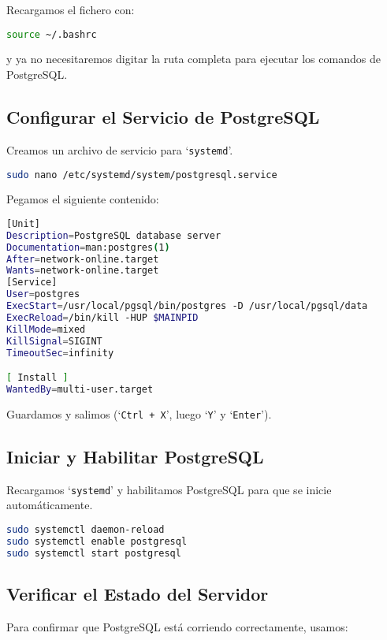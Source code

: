 \documentclass{article}
\begin{document}
Recargamos el fichero con:

\begin{lstlisting}[language=bash]
source ~/.bashrc
\end{lstlisting}

y ya no necesitaremos digitar la ruta completa para ejecutar los comandos de PostgreSQL.



\subsection{Configurar el Servicio de PostgreSQL}
Creamos un archivo de servicio para `\texttt{systemd}'.

\begin{lstlisting}[language=bash]
sudo nano /etc/systemd/system/postgresql.service
\end{lstlisting}

Pegamos el siguiente contenido:

\begin{lstlisting}[language=bash]
[Unit]
Description=PostgreSQL database server
Documentation=man:postgres(1)
After=network-online.target
Wants=network-online.target
[Service]
User=postgres
ExecStart=/usr/local/pgsql/bin/postgres -D /usr/local/pgsql/data
ExecReload=/bin/kill -HUP $MAINPID
KillMode=mixed
KillSignal=SIGINT
TimeoutSec=infinity

[ Install ]
WantedBy=multi-user.target
\end{lstlisting}

Guardamos y salimos (`\texttt{Ctrl + X}', luego `\texttt{Y}' y `\texttt{Enter}').

\subsection{Iniciar y Habilitar PostgreSQL}
Recargamos `\texttt{systemd}' y habilitamos PostgreSQL para que se inicie automáticamente.

\begin{lstlisting}[language=bash]
sudo systemctl daemon-reload
sudo systemctl enable postgresql
sudo systemctl start postgresql
\end{lstlisting}

\subsection{Verificar el Estado del Servidor}
Para confirmar que PostgreSQL está corriendo correctamente, usamos:
\end{document}
